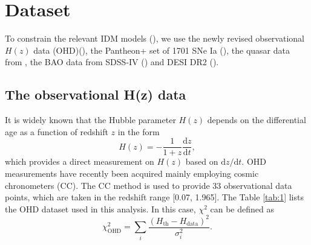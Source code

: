 \documentclass[twocolumn]{aastex631}
\begin{document}
\section{Dataset}

   To constrain the relevant IDM models (\cite{Basilakos_2009}), we use the newly revised
   observational $H(z)$ data (OHD)(\cite{PhysRevD.71.123001, Daniel.Stern_2010, 
   M.Moresco_2012, Zhang_2014, Moresco_2016, 10.1093/mnras/stx301, 10.1093/mnrasl/slv037, 
   Borghi_2022, Jiao_2023}), the Pantheon+ set of 1701 SNe Ia 
   (\cite{Scolnic_2022}), the quasar data from \cite{Lusso_2020}, 
   the BAO data from SDSS-IV (\cite{PhysRevD.103.083533}) and DESI DR2 
   (\cite{desicollaboration2025desidr2resultsii}).

\subsection{The observational H(z) data}

   It is widely known that the Hubble parameter $H(z)$ depends on
   the differential age as a function of redshift $z$ in the form
   \begin{equation}
      H(z)=-\frac{1}{1+z}\frac{\mathrm{d}z}{\mathrm{d}t},\label{eq:12}
   \end{equation}
   which provides a direct measurement on $H(z)$ based on
   $\mathrm{d}z/\mathrm{d}t$.
   OHD measurements have recently been acquired mainly employing
   cosmic chronometers (CC). The CC method is used to provide 33 observational
   data points, which are taken in the redshift range [0.07, 1.965].
   The Table \ref{tab:1} lists the OHD dataset used in this analysis.
   In this case, $\chi^2$ can be defined as
   \begin{equation}
      \chi_{\text{OHD}}^2=\sum_i\frac{(H_{\text{th}}-H_{\text{data}})^2}{\sigma_i^2}.
   \end{equation}
\end{document}
